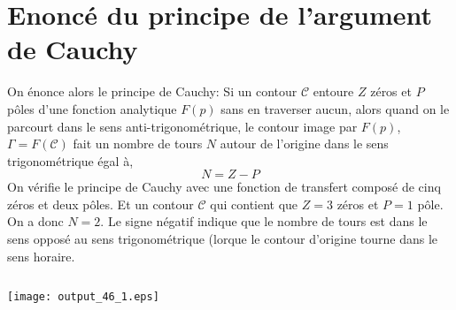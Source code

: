 \section{Enoncé du principe de l'argument de Cauchy}
On énonce alors le principe de Cauchy:
Si un contour \(\mathcal{C}\) entoure \(Z\) zéros et \(P\) pôles d'une
fonction analytique \(F(p)\) sans en traverser aucun, alors quand on le
parcourt dans le sens anti-trigonométrique, le contour image par
\(F(p)\), \(\Gamma=F(\mathcal{C})\) fait un nombre de tours \(N\) autour
de l'origine dans le sens trigonométrique égal à,
\[
    N=Z-P
\]
On vérifie le principe de Cauchy avec une fonction de transfert composé
de cinq zéros et deux pôles. Et un contour \(\mathcal{C}\) qui contient 
que \(Z=3\) zéros et \(P=1\) pôle. On a donc \(N=2\). Le signe négatif
indique que le nombre de tours est dans le sens opposé au sens
trigonométrique (lorque le contour d'origine tourne dans le sens
horaire.
\begin{tcolorbox}[breakable, size=fbox, boxrule=1pt, 
    pad at break*=1mm,colback=cellbackground, colframe=cellborder]
\inputminted{python}{codes/python/annexe_cauchy_cellule17.py}
\end{tcolorbox}
\begin{center}
    \texttt{[image: output\_46\_1.eps]}
\end{center}
